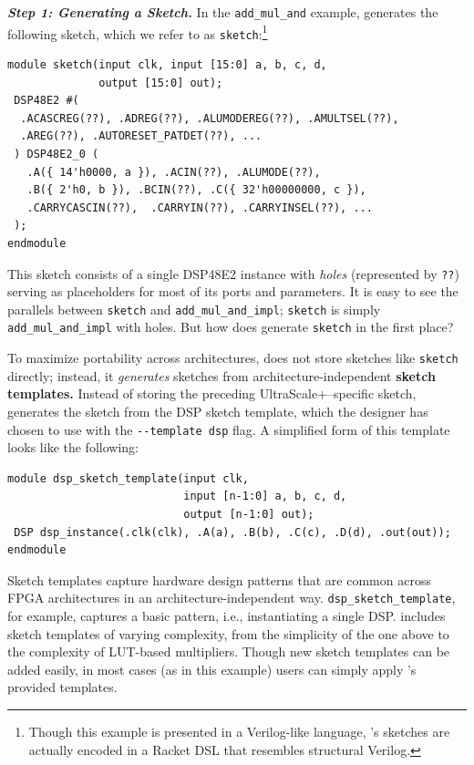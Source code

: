 \textit{\textbf{Step 1: Generating a Sketch.}}
In
  the \texttt{add\_mul\_and}
  example,
  \lr
  generates
  the following sketch,
  which we refer to as \texttt{sketch}:\footnote{
Though this example is presented in a Verilog-like language,
  \lr's sketches are actually encoded in a Racket DSL that resembles structural Verilog.}
\begin{verbatim}
module sketch(input clk, input [15:0] a, b, c, d,
              output [15:0] out);
 DSP48E2 #(
  .ACASCREG(??), .ADREG(??), .ALUMODEREG(??), .AMULTSEL(??), 
  .AREG(??), .AUTORESET_PATDET(??), ...
 ) DSP48E2_0 (
   .A({ 14'h0000, a }), .ACIN(??), .ALUMODE(??), 
   .B({ 2'h0, b }), .BCIN(??), .C({ 32'h00000000, c }),
   .CARRYCASCIN(??),  .CARRYIN(??), .CARRYINSEL(??), ...
 );
endmodule
\end{verbatim}
This sketch consists of a single DSP48E2 instance
  with \textit{holes} 
  (represented by \texttt{??}) 
  serving as placeholders for most of its ports and parameters.
It is easy to see  
  the parallels
  between \texttt{sketch}
  and
  \texttt{add\_mul\_and\_impl};
  \texttt{sketch}
  is simply 
  \texttt{add\_mul\_and\_impl}
  with holes.
But how does \lr generate \texttt{sketch}
  in the first place?

To maximize portability across architectures,
  \lr does not store sketches 
  like \texttt{sketch}
  directly; 
  instead, it \textit{generates} sketches
  from architecture-independent
  \textbf{sketch templates.}
Instead of storing
  the preceding UltraScale+--specific sketch,
  \lr generates the sketch
  from the DSP sketch template, which
  the designer has chosen to use 
  with the \mbox{\texttt{-{}-template dsp}} flag.
A simplified form of this template looks like the following:
\begin{verbatim}
module dsp_sketch_template(input clk,
                           input [n-1:0] a, b, c, d,
                           output [n-1:0] out);
 DSP dsp_instance(.clk(clk), .A(a), .B(b), .C(c), .D(d), .out(out));
endmodule
\end{verbatim}
Sketch templates
  capture hardware design patterns
that are common across FPGA architectures
  in an
  architecture-independent way.
\texttt{dsp\_sketch\_template},
  for example, 
  captures
  a basic pattern, i.e., 
  instantiating a single DSP.
\lr includes 
  sketch templates of varying complexity,
  from the simplicity of the one above 
  to the complexity of LUT-based multipliers.
Though new sketch templates
  can be added easily,
  in most cases
  (as in this example)
  users can simply apply
  \lr's provided templates.

